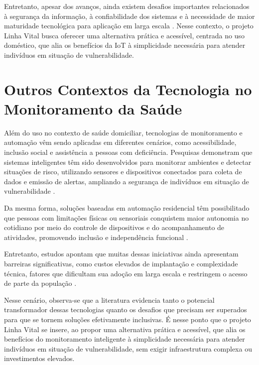 Entretanto, apesar dos avanços, ainda existem desafios importantes relacionados à segurança da informação, à confiabilidade dos sistemas e à necessidade de maior maturidade tecnológica para aplicação em larga escala \cite{predictivehealthcare2020}. Nesse contexto, o projeto Linha Vital busca oferecer uma alternativa prática e acessível, centrada no uso doméstico, que alia os benefícios da IoT à simplicidade necessária para atender indivíduos em situação de vulnerabilidade.

\section{Outros Contextos da Tecnologia no Monitoramento da Saúde}

Além do uso no contexto de saúde domiciliar, tecnologias de monitoramento e automação vêm sendo aplicadas em diferentes cenários, como acessibilidade, inclusão social e assistência a pessoas com deficiência. Pesquisas demonstram que sistemas inteligentes têm sido desenvolvidos para monitorar ambientes e detectar situações de risco, utilizando sensores e dispositivos conectados para coleta de dados e emissão de alertas, ampliando a segurança de indivíduos em situação de vulnerabilidade \cite{reboucas2019}.

Da mesma forma, soluções baseadas em automação residencial têm possibilitado que pessoas com limitações físicas ou sensoriais conquistem maior autonomia no cotidiano por meio do controle de dispositivos e do acompanhamento de atividades, promovendo inclusão e independência funcional \cite{automacaoiot2019}.

Entretanto, estudos apontam que muitas dessas iniciativas ainda apresentam barreiras significativas, como custos elevados de implantação e complexidade técnica, fatores que dificultam sua adoção em larga escala e restringem o acesso de parte da população \cite{reboucas2019}.

Nesse cenário, observa-se que a literatura evidencia tanto o potencial transformador dessas tecnologias quanto os desafios que precisam ser superados para que se tornem soluções efetivamente inclusivas. É nesse ponto que o projeto Linha Vital se insere, ao propor uma alternativa prática e acessível, que alia os benefícios do monitoramento inteligente à simplicidade necessária para atender indivíduos em situação de vulnerabilidade, sem exigir infraestrutura complexa ou investimentos elevados.